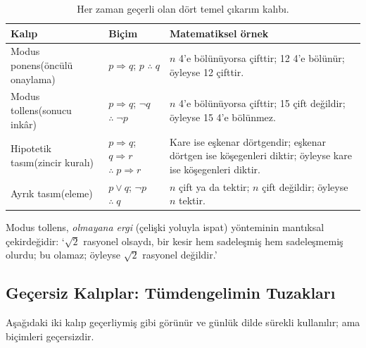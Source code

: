 \begin{table}[h]
\centering\small
\renewcommand{\arraystretch}{1.35}
\begin{tabularx}{\linewidth}{>{\raggedright\arraybackslash}p{3.1cm}>{\raggedright\arraybackslash}p{3.3cm}>{\raggedright\arraybackslash}X}
\toprule
\textbf{Kalıp} & \textbf{Biçim} & \textbf{Matematiksel örnek}\\
\midrule
Modus ponens\newline(öncülü onaylama) & $p\Rightarrow q$;\; $p$ \;$\therefore\; q$ & $n$ 4’e bölünüyorsa çifttir; 12 4’e bölünür; öyleyse 12 çifttir.\\
Modus tollens\newline(sonucu inkâr) & $p\Rightarrow q$;\; $\neg q$ \;$\therefore\; \neg p$ & $n$ 4’e bölünüyorsa çifttir; 15 çift değildir; öyleyse 15 4’e bölünmez.\\
Hipotetik tasım\newline(zincir kuralı) & $p\Rightarrow q$;\; $q\Rightarrow r$ \;$\therefore\; p\Rightarrow r$ & Kare ise eşkenar dörtgendir; eşkenar dörtgen ise köşegenleri diktir; öyleyse kare ise köşegenleri diktir.\\
Ayrık tasım\newline(eleme) & $p\vee q$;\; $\neg p$ \;$\therefore\; q$ & $n$ çift ya da tektir; $n$ çift değildir; öyleyse $n$ tektir.\\
\bottomrule
\end{tabularx}
\caption{Her zaman geçerli olan dört temel çıkarım kalıbı.}
\end{table}

Modus tollens, \emph{olmayana ergi} (çelişki yoluyla ispat) yönteminin mantıksal çekirdeğidir: ‘$\sqrt2$ rasyonel olsaydı, bir kesir hem sadeleşmiş hem sadeleşmemiş olurdu; bu olamaz; öyleyse $\sqrt2$ rasyonel değildir.’

\subsection{Geçersiz Kalıplar: Tümdengelimin Tuzakları}

Aşağıdaki iki kalıp geçerliymiş gibi görünür ve günlük dilde sürekli kullanılır; ama biçimleri geçersizdir.

